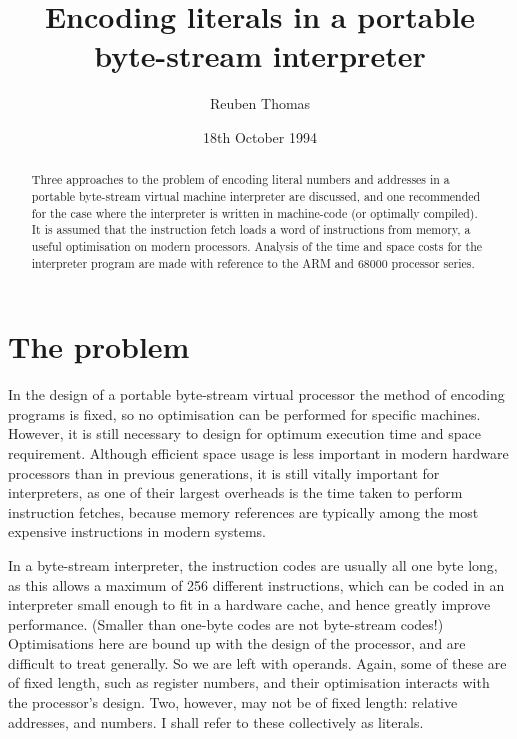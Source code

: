 \documentclass{article}
\title{Encoding literals in a portable byte-stream interpreter}
\author{Reuben Thomas}
\date{18th October 1994}
\begin{document}
\maketitle

\begin{abstract}
Three approaches to the problem of encoding literal numbers and addresses in a
portable byte-stream virtual machine interpreter are discussed, and one recommended
for the case where the interpreter is written in machine-code (or optimally compiled).
It is assumed that the instruction fetch loads a word of instructions from memory,
a useful optimisation on modern processors. Analysis of the time and space costs
for the interpreter program are made with reference to the ARM and 68000 processor
series.
\end{abstract}

\section{The problem}

In the design of a portable byte-stream virtual processor the method of encoding
programs is fixed, so no optimisation can be performed for specific machines.
However, it is still necessary to design for optimum execution time and space
requirement. Although efficient space usage is less important in modern hardware
processors than in previous generations, it is still vitally important for interpreters,
as one of their largest overheads is the time taken to perform instruction fetches,
because memory references are typically among the most expensive instructions
in modern systems.

In a byte-stream interpreter, the instruction codes are usually all one byte long,
as this allows a maximum of 256 different instructions, which can be coded in
an interpreter small enough to fit in a hardware cache, and hence greatly improve
performance. (Smaller than one-byte codes are not byte-stream codes!) Optimisations
here are bound up with the design of the processor, and are difficult to treat
generally. So we are left with operands. Again, some of these are of fixed length,
such as register numbers, and their optimisation interacts with the processor's
design. Two, however, may not be of fixed length: relative addresses, and numbers.
I shall refer to these collectively as literals.
\end{document}
